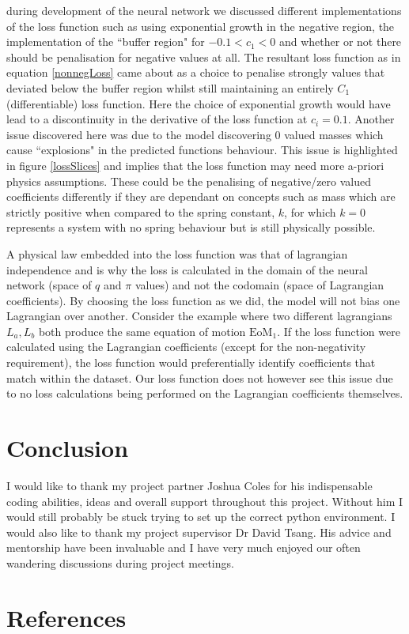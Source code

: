 \documentclass[10pt]{iopart}
\begin{document}
during development of the neural network we discussed different implementations of the loss function such as using exponential growth in the negative region, the implementation of the ``buffer region" for $-0.1 < c_1 < 0$ and whether or not there should be penalisation for negative values at all. The resultant loss function as in equation \ref{nonnegLoss} came about as a choice to penalise strongly values that deviated below the buffer region whilst still maintaining an entirely $C_1$ (differentiable) loss function. Here the choice of exponential growth would have lead to a discontinuity in the derivative of the loss function at $c_i = 0.1$. Another issue discovered here was due to the model discovering 0 valued masses which cause ``explosions" in the predicted functions behaviour. This issue is highlighted in figure \ref{lossSlices} and implies that the loss function may need more a-priori physics assumptions. These could be the penalising of negative/zero valued coefficients differently if they are dependant on concepts such as mass which are strictly positive when compared to the spring constant, $k$, for which $k=0$ represents a system with no spring behaviour but is still physically possible. 



A physical law embedded into the loss function was that of lagrangian independence and is why the loss is calculated in the domain of the neural network (space of $q$ and $\pi$ values) and not the codomain (space of Lagrangian coefficients). By choosing the loss function as we did, the model will not bias one Lagrangian over another. Consider the example where two different lagrangians $L_a, L_b$ both produce the same equation of motion $\textrm{EoM}_1$. If the loss function were calculated using the Lagrangian coefficients (except for the non-negativity requirement), the loss function would preferentially identify coefficients that match within the dataset. Our loss function does not however see this issue due to no loss calculations being performed on the Lagrangian coefficients themselves.

\section{Conclusion}
\ack
I would like to thank my project partner Joshua Coles for his indispensable coding abilities, ideas and overall support throughout this project. Without him I would still probably be stuck trying to set up the correct python environment. I would also like to thank my project supervisor Dr David Tsang. His advice and mentorship have been invaluable and I have very much enjoyed our often wandering discussions during project meetings. 
\section*{References}


\end{document}
